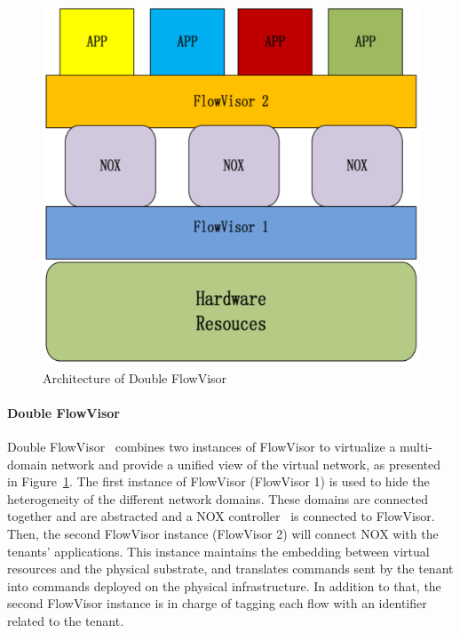 \begin{figure}[ht]
    \centering
    \includegraphics[scale=0.6]{figures/double_fv.pdf}
    \caption{Architecture of Double FlowVisor~\cite{DoubleFV-Yin2013}}
    \label{fig:double-fv}
\end{figure}

\paragraph{Double FlowVisor}
Double FlowVisor~\cite{DoubleFV-Yin2013} combines two instances of FlowVisor to virtualize a multi-domain network and provide a unified view of the virtual network, as presented in Figure~\ref{fig:double-fv}. The first instance of FlowVisor (FlowVisor 1) is used to hide the heterogeneity of the different network domains. These domains are connected together and are abstracted and a NOX controller~\cite{nox-gude2008} is connected to FlowVisor.
Then, the second FlowVisor instance (FlowVisor 2)  will connect NOX with the tenants' applications. This instance maintains the embedding between virtual resources and the physical substrate, and translates commands sent by the tenant into commands deployed on the physical infrastructure. In addition to that, the second FlowVisor instance is in charge of tagging each flow with an identifier related to the tenant.

